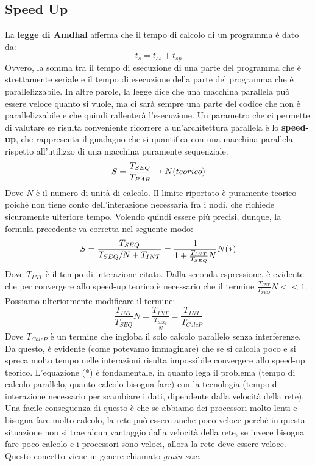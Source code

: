 \subsection{Speed Up}
La \textbf{legge di Amdhal} afferma che il tempo di calcolo di un programma è dato da: 
\[t_s=t_{ss}+t_{sp}\]
Ovvero, la somma tra il tempo di esecuzione di una parte del programma che è strettamente seriale e il
tempo di esecuzione della parte del programma che è parallelizzabile. In altre parole, la legge dice che una macchina parallela può essere veloce quanto si vuole, ma ci sarà sempre una parte del codice che non è parallelizzabile e che quindi rallenterà l'esecuzione. Un parametro che ci permette di valutare se risulta conveniente ricorrere a un'architettura parallela è lo \textbf{speed-up}, che rappresenta il guadagno che si quantifica con una macchina parallela rispetto all'utilizzo di una macchina puramente sequenziale: 
\[S=\frac{T_{SEQ}}{T_{PAR}} \rightarrow N \space (teorico)\]
Dove \(N\) è il numero di unità di calcolo. Il limite riportato è puramente teorico poiché non tiene conto dell'interazione necessaria fra i nodi, che richiede sicuramente ulteriore tempo. Volendo quindi essere più precisi, dunque, la formula precedente va corretta nel seguente modo:
\[S=\frac{T_{SEQ}}{T_{SEQ}/N+T_{INT}}=\frac{1}{1+\frac{T_{INT}}{T_{SEQ}}N}N \space \space (*)\]
Dove \(T_{INT}\) è il tempo di interazione citato. Dalla seconda espressione, è evidente che per convergere allo speed-up teorico è necessario che il termine \(\frac{T_{INT}}{T_{SEQ}}N<<1\). Possiamo ulteriormente modificare il termine:
\[\frac{T_{INT}}{T_{SEQ}}N=\frac{T_{INT}}{\frac{T_{SEQ}}{N}}=\frac{T_{INT}}{T_{CalcP}}\]
Dove \(T_{CalcP}\) è un termine che ingloba il solo calcolo parallelo senza interferenze. Da questo, è evidente (come potevamo immaginare) che se si calcola poco e si spreca molto tempo nelle interazioni risulta impossibile convergere allo speed-up teorico. L'equazione (*) è fondamentale, in quanto lega il problema (tempo di calcolo parallelo, quanto calcolo bisogna fare) con la tecnologia (tempo di interazione necessario per scambiare i dati, dipendente dalla velocità della rete). Una facile conseguenza di questo è che se abbiamo dei processori molto lenti e bisogna fare molto calcolo, la rete può essere anche poco veloce perché in questa situazione non si trae alcun vantaggio dalla velocità della rete, se invece bisogna fare poco calcolo e i processori sono veloci, allora la rete deve essere veloce. Questo concetto viene in genere chiamato \textit{grain size}.
\\
